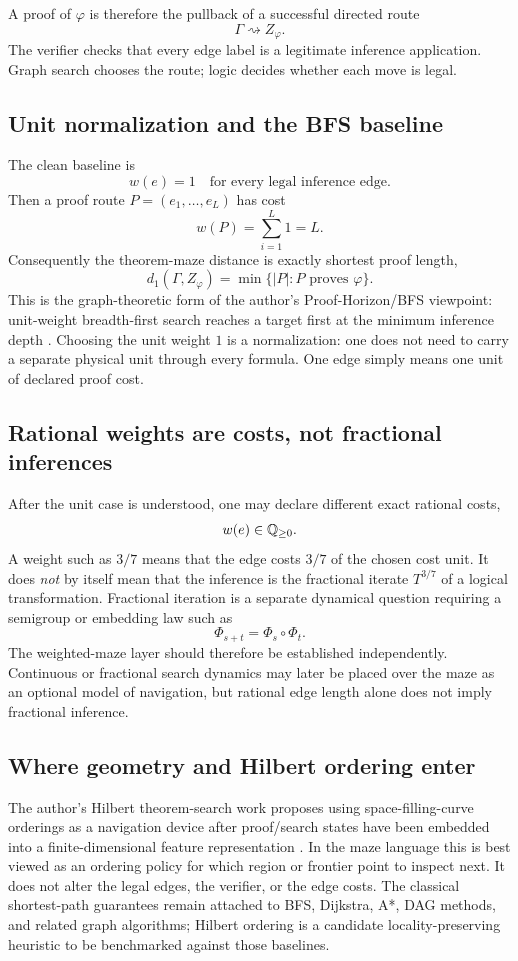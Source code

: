 A proof of $\varphi$ is therefore the pullback of a successful directed route
\[
\Gamma\rightsquigarrow Z_\varphi.
\]
The verifier checks that every edge label is a legitimate inference application. Graph search chooses the route; logic decides whether each move is legal.

\subsection{Unit normalization and the BFS baseline}
The clean baseline is
\[
\boxed{w(e)=1\quad\text{for every legal inference edge}.}
\]
Then a proof route $P=(e_1,\ldots,e_L)$ has cost
\[
w(P)=\sum_{i=1}^L1=L.
\]
Consequently the theorem-maze distance is exactly shortest proof length,
\[
d_1(\Gamma,Z_\varphi)=\min\{|P|:P\text{ proves }\varphi\}.
\]
This is the graph-theoretic form of the author's Proof-Horizon/BFS viewpoint: unit-weight breadth-first search reaches a target first at the minimum inference depth \cite{depths,horizon}. Choosing the unit weight $1$ is a normalization: one does not need to carry a separate physical unit through every formula. One edge simply means one unit of declared proof cost.

\subsection{Rational weights are costs, not fractional inferences}
After the unit case is understood, one may declare different exact rational costs,
\[
w(e)\in\mathbb{Q}_{\ge 0}.
\]
A weight such as $3/7$ means that the edge costs $3/7$ of the chosen cost unit. It does \emph{not} by itself mean that the inference is the fractional iterate $T^{3/7}$ of a logical transformation. Fractional iteration is a separate dynamical question requiring a semigroup or embedding law such as
\[
\Phi_{s+t}=\Phi_s\circ\Phi_t.
\]
The weighted-maze layer should therefore be established independently. Continuous or fractional search dynamics may later be placed over the maze as an optional model of navigation, but rational edge length alone does not imply fractional inference.

\subsection{Where geometry and Hilbert ordering enter}
The author's Hilbert theorem-search work proposes using space-filling-curve orderings as a navigation device after proof/search states have been embedded into a finite-dimensional feature representation \cite{hilbert}. In the maze language this is best viewed as an ordering policy for which region or frontier point to inspect next. It does not alter the legal edges, the verifier, or the edge costs. The classical shortest-path guarantees remain attached to BFS, Dijkstra, A*, DAG methods, and related graph algorithms; Hilbert ordering is a candidate locality-preserving heuristic to be benchmarked against those baselines.

